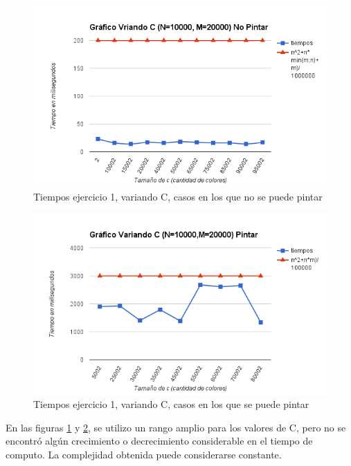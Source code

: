 \begin{figure}[H]
 \begin{center}
     \includegraphics[scale=0.6]{../Ejercicio1VariandoCNoPintar.png}
 \end{center}
 \caption{Tiempos ejercicio 1, variando C, casos en los que no se puede pintar}
 \label{Cno}
\end{figure}

\begin{figure}[H]
 \begin{center}
     \includegraphics[scale=0.6]{../Ejercicio1VariandoCPintar.png}
 \end{center}
 \caption{Tiempos ejercicio 1, variando C, casos en los que se puede pintar}
 \label{Csi}
\end{figure}

En las figuras \ref{Cno} y \ref{Csi}, se utilizo un rango amplio para los valores de C, pero no se encontró algún crecimiento o decrecimiento considerable en el tiempo de computo. La complejidad obtenida puede considerarse constante.